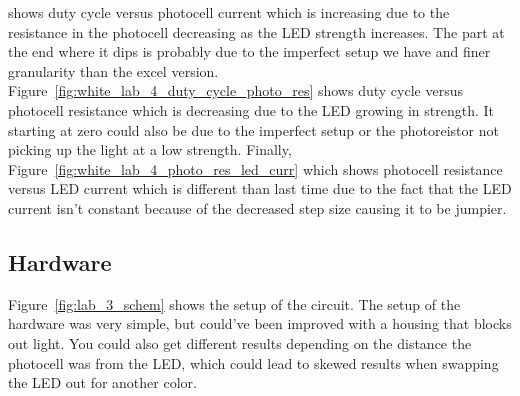 \documentclass[12pt,titlepage]{article}
\begin{document}
shows duty cycle versus photocell current which is increasing due to the resistance in the photocell decreasing as the LED strength increases. The part at the end where it dips
is probably due to the imperfect setup we have and finer granularity than the excel version. Figure~\ref{fig:white_lab_4_duty_cycle_photo_res} shows duty cycle versus photocell
resistance which is decreasing due to the LED growing in strength. It starting at zero could also be due to the imperfect setup or the photoreistor not picking up the light at a
low strength. Finally, Figure~\ref{fig:white_lab_4_photo_res_led_curr} which shows photocell resistance versus LED current which is different than last time due to the fact that
the LED current isn't constant because of the decreased step size causing it to be jumpier.
\subsection{Hardware}
Figure~\ref{fig:lab_3_schem} shows the setup of the circuit. The setup of the hardware was very simple, but
could've been improved with a housing that blocks out light. You could also get different results depending
on the distance the photocell was from the LED, which could lead to skewed results when swapping the LED out
for another color.
\clearpage
\end{document}
